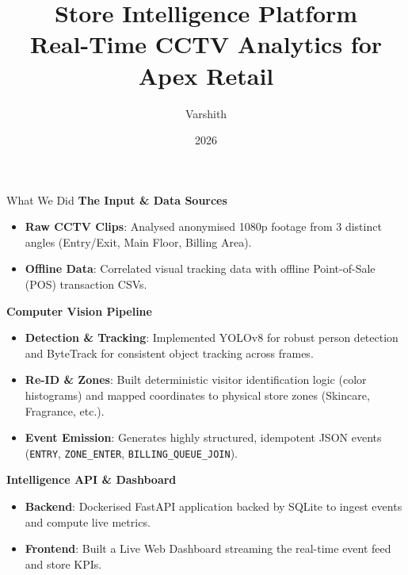 \documentclass[10pt]{beamer}
\title[Store Intelligence]{Store Intelligence Platform\\Real-Time CCTV Analytics for Apex Retail}
\author[Varshith]{
    Varshith
}
\institute[Apex Retail Project]{
Engineering Hiring Challenge \\
Computer Vision \& Analytics API Pipeline
}
\date{2026}
\begin{document}
\frame{\titlepage}

\begin{frame}{What We Did}
\textbf{The Input \& Data Sources}
\begin{itemize}
    \item \textbf{Raw CCTV Clips}: Analysed anonymised 1080p footage from 3 distinct angles (Entry/Exit, Main Floor, Billing Area).
    \item \textbf{Offline Data}: Correlated visual tracking data with offline Point-of-Sale (POS) transaction CSVs.
\end{itemize}

\vspace{0.3cm}
\textbf{Computer Vision Pipeline}
\begin{itemize}
    \item \textbf{Detection \& Tracking}: Implemented YOLOv8 for robust person detection and ByteTrack for consistent object tracking across frames.
    \item \textbf{Re-ID \& Zones}: Built deterministic visitor identification logic (color histograms) and mapped coordinates to physical store zones (Skincare, Fragrance, etc.).
    \item \textbf{Event Emission}: Generates highly structured, idempotent JSON events (\texttt{ENTRY}, \texttt{ZONE\_ENTER}, \texttt{BILLING\_QUEUE\_JOIN}).
\end{itemize}

\vspace{0.3cm}
\textbf{Intelligence API \& Dashboard}
\begin{itemize}
    \item \textbf{Backend}: Dockerised FastAPI application backed by SQLite to ingest events and compute live metrics.
    \item \textbf{Frontend}: Built a Live Web Dashboard streaming the real-time event feed and store KPIs.
\end{itemize}
\end{frame}
\end{document}
